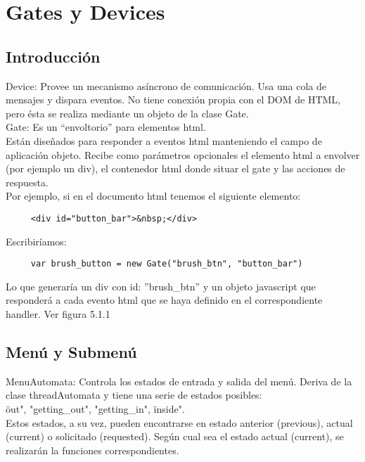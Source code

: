 \section{Gates y Devices}
\label{sec:gates_devices}

\subsection{Introducción}
\label{subsection:intro_gates}

Device: Provee un mecanismo asíncrono de comunicación. Usa una cola de mensajes y dispara eventos. No tiene conexión propia con el DOM de HTML,
pero ésta se realiza mediante un objeto de la clase Gate.\\

Gate: Es un “envoltorio” para elementos html.\\

Están diseñados para responder a eventos html manteniendo el campo de aplicación objeto. Recibe como parámetros opcionales el elemento html a 
envolver (por ejemplo un div), el contenedor html donde situar el gate y las acciones de respuesta.\\

Por ejemplo, si en el documento html tenemos el siguiente elemento:
\begin{verbatim}
     <div id="button_bar">&nbsp;</div>
\end{verbatim}
Escribiríamos:
\begin{verbatim}
     var brush_button = new Gate("brush_btn", "button_bar")
\end{verbatim}
Lo que generaría un div con id: ”brush\_btn” y un objeto javascript que responderá a cada evento html que se haya definido en el correspondiente 
handler. Ver figura 5.1.1


\subsection{Menú y Submenú}
\label{subsection:menu}

MenuAutomata: Controla los estados de entrada y salida del menú. Deriva de la clase threadAutomata y tiene una serie de estados posibles:\\
\"out", "getting\_out", "getting\_in", \"inside".\\
Estos estados, a su vez, pueden encontrarse en estado anterior (previous), actual (current) o solicitado (requested). Según cual sea  el estado 
actual (current), se realizarán la funciones correspondientes.\\

